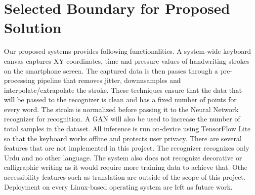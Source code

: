 \documentclass[12pt,a4paper]{report}
\begin{document}
\section{Selected Boundary for Proposed Solution}
Our proposed systems provides following functionalities. A system-wide keyboard canvas captures XY coordinates, time and pressure values of handwriting strokes on the smartphone screen. The captured data is then passes through a pre-processing pipeline that removes jitter, downnsamples and interpolate/extrapolate the stroke. These techniques ensure that the data that will be passed to the recognizer is clean and has a fixed number of points for every word. The stroke is normalized before passing it to the Neural Network recognizer for recognition. A GAN will also be used to increase the number of total samples in the dataset. All inference is run on-device using TensorFlow Lite so that the keyboard works offline and protects user privacy.
There are several features that are not implemented in this project. The recognizer recognizes only Urdu and no other language. The system also does not recognize decorative or calligraphic writing as it would require more training data to achieve that. Othe accessibility features such as translation are outside of the scope of this project. Deployment on every Linux-based operating system are left as future work.
\end{document}
